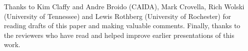 \documentclass{elsart}
\begin{document}
Thanks to Kim Claffy and Andre Broido
(CAIDA), Mark Crovella, Rich Wolski (University of Tennessee) and
Lewis Rothberg (University of Rochester) for reading drafts of this
paper and making valuable comments.  Finally, thanks to the reviewers
who have read and helped improve earlier presentations of this work.


%

\end{document}
